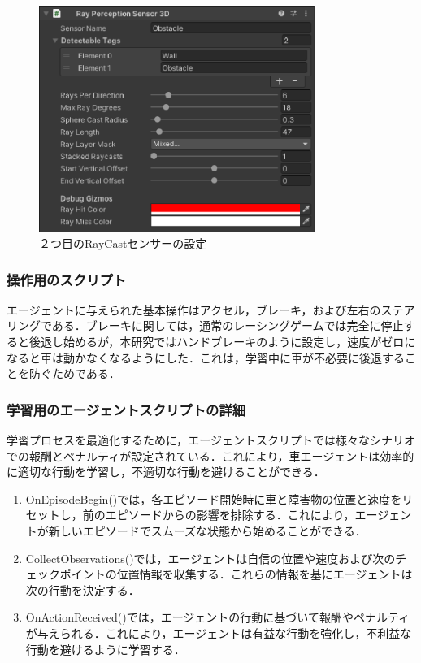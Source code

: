 \begin{figure}[H]
    \centering
    \includegraphics[width=0.8\textwidth]{figures/SecondRaycastSettings.eps} %
    \caption{２つ目のRayCastセンサーの設定} %
    \label{fig:second-raycast-settings} %
\end{figure}

\subsubsection{操作用のスクリプト}
エージェントに与えられた基本操作はアクセル，ブレーキ，および左右のステアリングである．ブレーキに関しては，通常のレーシングゲームでは完全に停止すると後退し始めるが，本研究ではハンドブレーキのように設定し，速度がゼロになると車は動かなくなるようにした．これは，学習中に車が不必要に後退することを防ぐためである．

\subsubsection{学習用のエージェントスクリプトの詳細}
学習プロセスを最適化するために，エージェントスクリプトでは様々なシナリオでの報酬とペナルティが設定されている．これにより，車エージェントは効率的に適切な行動を学習し，不適切な行動を避けることができる．
\begin{enumerate}
  \item OnEpisodeBegin()では，各エピソード開始時に車と障害物の位置と速度をリセットし，前のエピソードからの影響を排除する．これにより，エージェントが新しいエピソードでスムーズな状態から始めることができる．
  \item CollectObservations()では，エージェントは自信の位置や速度および次のチェックポイントの位置情報を収集する．これらの情報を基にエージェントは次の行動を決定する．
  \item OnActionReceived()では，エージェントの行動に基づいて報酬やペナルティが与えられる．これにより，エージェントは有益な行動を強化し，不利益な行動を避けるように学習する．
\end{enumerate}

